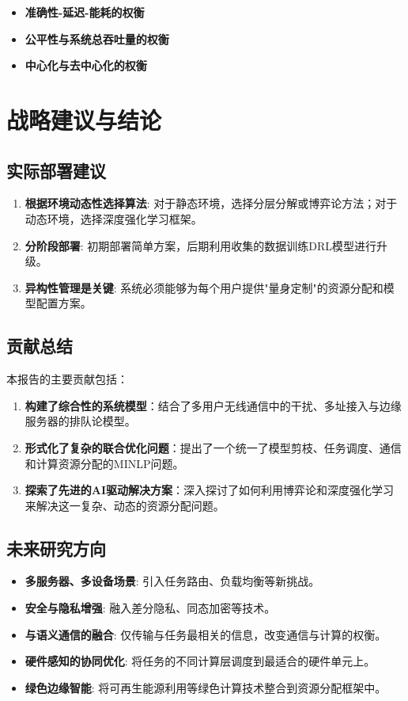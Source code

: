 \documentclass[11pt, a4paper]{article}
\begin{document}
\begin{itemize}
\item \textbf{准确性-延迟-能耗的权衡}
\item \textbf{公平性与系统总吞吐量的权衡}
\item \textbf{中心化与去中心化的权衡}
\end{itemize}

\section{战略建议与结论}

\subsection{实际部署建议}

\begin{enumerate}
\item \textbf{根据环境动态性选择算法}: 对于静态环境，选择分层分解或博弈论方法；对于动态环境，选择深度强化学习框架。
\item \textbf{分阶段部署}: 初期部署简单方案，后期利用收集的数据训练DRL模型进行升级。
\item \textbf{异构性管理是关键}: 系统必须能够为每个用户提供"量身定制"的资源分配和模型配置方案。
\end{enumerate}

\subsection{贡献总结}

本报告的主要贡献包括：

\begin{enumerate}
\item \textbf{构建了综合性的系统模型}：结合了多用户无线通信中的干扰、多址接入与边缘服务器的排队论模型。
\item \textbf{形式化了复杂的联合优化问题}：提出了一个统一了模型剪枝、任务调度、通信和计算资源分配的MINLP问题。
\item \textbf{探索了先进的AI驱动解决方案}：深入探讨了如何利用博弈论和深度强化学习来解决这一复杂、动态的资源分配问题。
\end{enumerate}

\subsection{未来研究方向}

\begin{itemize}
\item \textbf{多服务器、多设备场景}: 引入任务路由、负载均衡等新挑战。
\item \textbf{安全与隐私增强}: 融入差分隐私、同态加密等技术。
\item \textbf{与语义通信的融合}: 仅传输与任务最相关的信息，改变通信与计算的权衡。
\item \textbf{硬件感知的协同优化}: 将任务的不同计算层调度到最适合的硬件单元上。
\item \textbf{绿色边缘智能}: 将可再生能源利用等绿色计算技术整合到资源分配框架中。
\end{itemize}
\end{document}
